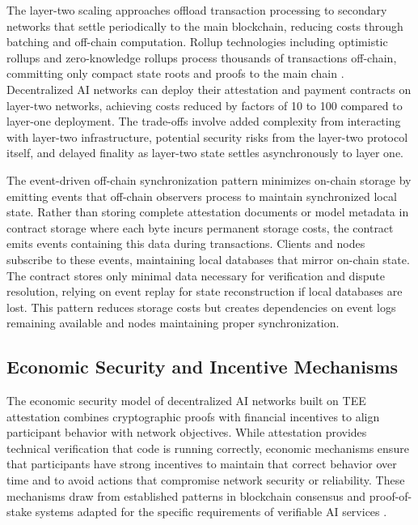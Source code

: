 The layer-two scaling approaches offload transaction processing to secondary networks that settle periodically to the main blockchain, reducing costs through batching and off-chain computation. Rollup technologies including optimistic rollups and zero-knowledge rollups process thousands of transactions off-chain, committing only compact state roots and proofs to the main chain \cite{ethereum_yellow}. Decentralized AI networks can deploy their attestation and payment contracts on layer-two networks, achieving costs reduced by factors of 10 to 100 compared to layer-one deployment. The trade-offs involve added complexity from interacting with layer-two infrastructure, potential security risks from the layer-two protocol itself, and delayed finality as layer-two state settles asynchronously to layer one.

The event-driven off-chain synchronization pattern minimizes on-chain storage by emitting events that off-chain observers process to maintain synchronized local state. Rather than storing complete attestation documents or model metadata in contract storage where each byte incurs permanent storage costs, the contract emits events containing this data during transactions. Clients and nodes subscribe to these events, maintaining local databases that mirror on-chain state. The contract stores only minimal data necessary for verification and dispute resolution, relying on event replay for state reconstruction if local databases are lost. This pattern reduces storage costs but creates dependencies on event logs remaining available and nodes maintaining proper synchronization.

\subsection{Economic Security and Incentive Mechanisms}

The economic security model of decentralized AI networks built on TEE attestation combines cryptographic proofs with financial incentives to align participant behavior with network objectives. While attestation provides technical verification that code is running correctly, economic mechanisms ensure that participants have strong incentives to maintain that correct behavior over time and to avoid actions that compromise network security or reliability. These mechanisms draw from established patterns in blockchain consensus and proof-of-stake systems adapted for the specific requirements of verifiable AI services \cite{stake_based_consensus}.

